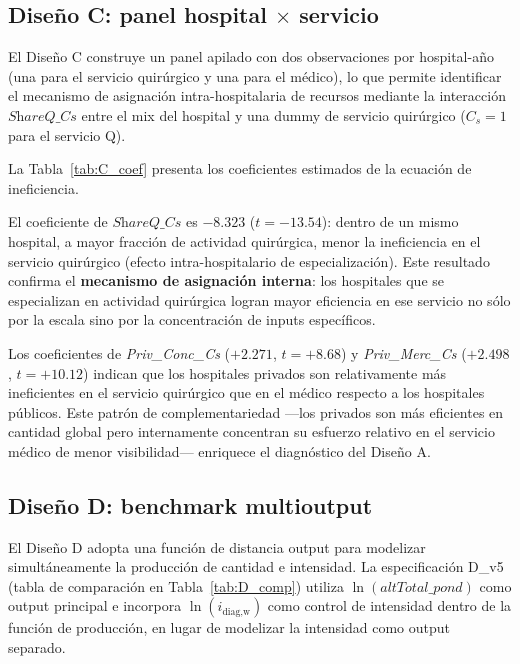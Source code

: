 \subsection{Diseño C: panel hospital $\times$ servicio}
\label{subsec:C}

El Diseño C construye un panel apilado con dos observaciones por hospital-año (una para el servicio quirúrgico y una para el médico), lo que permite identificar el mecanismo de asignación intra-hospitalaria de recursos mediante la interacción \(\textit{ShareQ\_Cs}\) entre el mix del hospital y una dummy de servicio quirúrgico ($C_s = 1$ para el servicio Q).

La Tabla~\ref{tab:C_coef} presenta los coeficientes estimados de la ecuación de ineficiencia.

\begin{table}[htbp]
\centering
\caption{Diseño C: coeficientes de ineficiencia — panel hospital $\times$ servicio}
\label{tab:C_coef}
\small

\end{table}

El coeficiente de \(\textit{ShareQ\_Cs}\) es $-8.323$ ($t = -13.54$): dentro de un mismo hospital, a mayor fracción de actividad quirúrgica, menor la ineficiencia en el servicio quirúrgico (efecto intra-hospitalario de especialización). Este resultado confirma el \textbf{mecanismo de asignación interna}: los hospitales que se especializan en actividad quirúrgica logran mayor eficiencia en ese servicio no sólo por la escala sino por la concentración de inputs específicos.

Los coeficientes de \textit{Priv\_Conc\_Cs} ($+2.271$, $t = +8.68$) y \textit{Priv\_Merc\_Cs} ($+2.498$, $t = +10.12$) indican que los hospitales privados son relativamente más ineficientes en el servicio quirúrgico que en el médico respecto a los hospitales públicos. Este patrón de complementariedad —los privados son más eficientes en cantidad global pero internamente concentran su esfuerzo relativo en el servicio médico de menor visibilidad— enriquece el diagnóstico del Diseño A.

\subsection{Diseño D: benchmark multioutput}
\label{subsec:D}

El Diseño D adopta una función de distancia output para modelizar simultáneamente la producción de cantidad e intensidad. La especificación D\_v5 (tabla de comparación en Tabla~\ref{tab:D_comp}) utiliza \(\ln(\textit{altTotal\_pond})\) como output principal e incorpora \(\ln(i_{\text{diag,w}})\) como control de intensidad dentro de la función de producción, en lugar de modelizar la intensidad como output separado.

